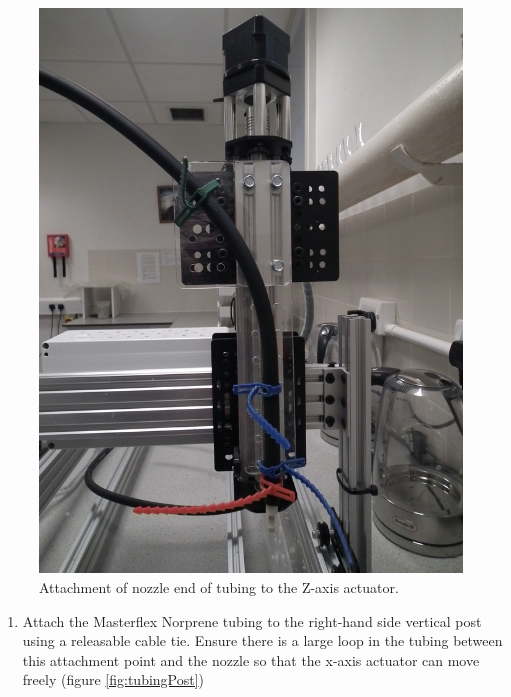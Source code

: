 \documentclass[
]{book}
\providecommand{\tightlist}{%
  \setlength{\itemsep}{0pt}\setlength{\parskip}{0pt}}
\begin{document}
\begin{figure}

{\centering \includegraphics[width=0.75\linewidth]{images/pump4} 

}

\caption{Attachment of nozzle end of tubing to the Z-axis actuator.}\label{fig:attachNozzle}
\end{figure}

\begin{enumerate}
\def\labelenumi{\arabic{enumi}.}
\setcounter{enumi}{1}
\tightlist
\item
  Attach the Masterflex Norprene tubing to the right-hand side vertical post using a releasable cable tie. Ensure there is a large loop in the tubing between this attachment point and the nozzle so that the x-axis actuator can move freely (figure \ref{fig:tubingPost})
\end{enumerate}
\end{document}
